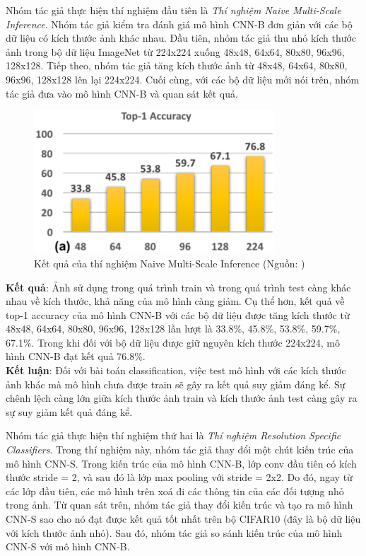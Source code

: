 {    \noindent 
    Nhóm tác giả thực hiện thí nghiệm đầu tiên là \textit{Thí nghiệm Naive Multi-Scale Inference}.
    Nhóm tác giả kiểm tra đánh giá mô hình CNN-B đơn giản với các bộ dữ liệu có kích thước ảnh khác nhau.
    Đầu tiên, nhóm tác giả thu nhỏ kích thước ảnh trong bộ dữ liệu ImageNet từ 224x224 xuống 48x48, 64x64, 80x80, 96x96, 128x128.
    Tiếp theo, nhóm tác giả tăng kích thước ảnh từ 48x48, 64x64, 80x80, 96x96, 128x128 lên lại 224x224.
    Cuối cùng, với các bộ dữ liệu mới nói trên, nhóm tác giả đưa vào mô hình CNN-B và quan sát kết quả.

    \begin{figure}[H]
        \centering
        \includegraphics[width=9cm] {images/snip_naive_multi_scale_infer}
        \caption{Kết quả của thí nghiệm Naive Multi-Scale Inference (Nguồn: \cite{singh2018analysis})}
        \label{fig:snip_naive_multi_scale_infer}
    \end{figure}

    \noindent
    \textbf{Kết quả}:
    Ảnh sử dụng trong quá trình train và trong quá trình test càng khác nhau về kích thước, khả năng của mô hình càng giảm.
    Cụ thể hơn, kết quả về top-1 accuracy của mô hình CNN-B với các bộ dữ liệu được tăng kích thước từ 48x48, 64x64, 80x80, 96x96, 128x128 lần lượt là 33.8\%, 45.8\%, 53.8\%, 59.7\%, 67.1\%.
    Trong khi đối với bộ dữ liệu được giữ nguyên kích thước 224x224, mô hình CNN-B đạt kết quả 76.8\%. \\
    \textbf{Kết luận}:
    Đối với bài toán classification, việc test mô hình với các kích thước ảnh khác mà mô hình chưa được train sẽ gây ra kết quả suy giảm đáng kể.
    Sự chênh lệch càng lớn giữa kích thước ảnh train và kích thước ảnh test càng gây ra sự suy giảm kết quả đáng kể.

    \noindent
    Nhóm tác giả thực hiện thí nghiệm thứ hai là \textit{Thí nghiệm Resolution Specific Classifiers}.
    Trong thí nghiệm này, nhóm tác giả thay đổi một chút kiến trúc của mô hình CNN-S.
    Trong kiến trúc của mô hình CNN-B, lớp conv đầu tiên có kích thước stride = 2, và sau đó là lớp max pooling với stride = 2x2.
    Do đó, ngay từ các lớp đầu tiên, các mô hình trên xoá đi các thông tin của các đối tượng nhỏ trong ảnh.
    Từ quan sát trên, nhóm tác giả thay đổi kiến trúc và tạo ra mô hình CNN-S sao cho nó đạt được kết quả tốt nhất trên bộ CIFAR10 (đây là bộ dữ liệu với kích thước ảnh nhỏ).
    Sau đó, nhóm tác giả so sánh kiến trúc của mô hình CNN-S với mô hình CNN-B.

}
